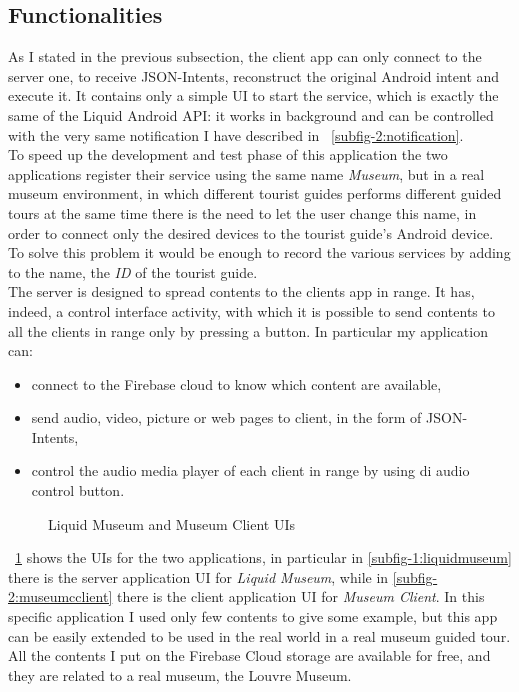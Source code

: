 \subsection{Functionalities}
As I stated in the previous subsection, the client app can only connect to the server one, to receive JSON-Intents, reconstruct the original Android intent and execute it. It contains only a simple UI to start the service, which is exactly the same of the Liquid Android API: it works in background and can be controlled with the very same notification I have described in \figurename~\ref{subfig-2:notification}. \\
To speed up the development and test phase of this application the two applications register their service using the same name \textit{Museum}, but in a real museum environment, in which different tourist guides performs different guided tours at the same time there is the need to let the user change this name, in order to connect only the desired devices to the tourist guide's Android device. To solve this problem it would be enough to record the various services by adding to the name, the \textit{ID} of the tourist guide.\\
The server is designed to spread contents to the clients app in range. It has, indeed, a control interface activity, with which it is possible to send contents to all the clients in range only by pressing a button. In particular my application can:
\begin{itemize}
	\item connect to the Firebase cloud to know which content are available,
	\item send audio, video, picture or web pages to client, in the form of JSON-Intents,
	\item control the audio media player of each client in range by using di audio control button.
\end{itemize}
\begin{figure}[h]
	\centering
	\begin{minipage}{.49\textwidth}\centering
	\end{minipage}
	\begin{minipage}{.49\textwidth}\centering
	\end{minipage}
	\caption{Liquid Museum and Museum Client UIs}
	\label{fig:5.11}
\end{figure}
\figurename~\ref{fig:5.11} shows the UIs for the two applications, in particular in \ref{subfig-1:liquidmuseum} there is the server application UI for \textit{Liquid Museum}, while in \ref{subfig-2:museumcclient} there is the client application UI for \textit{Museum Client}. In this specific application I used only few contents to give some example, but this app can be easily extended to be used in the real world in a real museum guided tour. All the contents I put on the Firebase Cloud storage are available for free, and they are related to a real museum, the Louvre Museum.
